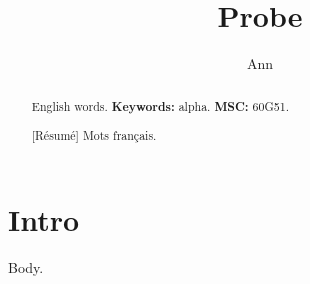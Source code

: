 \documentclass{amsart}
\begin{document}
\title{Probe}\author{Ann}
\maketitle
\begin{abstract}
English words. \textbf{Keywords:} alpha. \textbf{MSC:} 60G51.
\end{abstract}
\begin{abstract}[R\'esum\'e]
Mots fran\c{c}ais.
\end{abstract}
\section{Intro}
Body.
\end{document}

